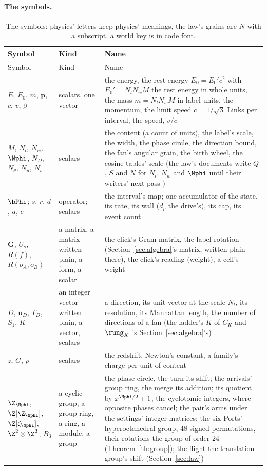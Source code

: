 \paragraph{The symbols.} {\footnotesize
\begin{longtable}{L{1.75in}L{1.0in}L{3.25in}}
\caption{\label{tab:notation}The symbols: physics' letters keep physics' meanings, the law's grains are $N$ with a subscript, a world key is in code font.}\\
\toprule
Symbol & Kind & Name \\
\midrule
\endfirsthead
\toprule
Symbol & Kind & Name \\
\midrule
\endhead
\bottomrule
\endlastfoot
$E$, $E_0$, $m$, $\mathbf p$, $c$, $v$, $\beta$ & scalars, one vector & the energy, the rest energy $E_0 = E_0' c^2$ with $E_0' = N_l N_w M$ the rest energy in whole units, the mass $m = N_l N_w M$ in label units, the momentum, the limit speed $c = 1/\sqrt3$ Links per interval, the speed, $v/c$ \\


$M$, $N_l$, $N_w$, $\Nphi$, $N_D$, $N_\theta$, $N_u$, $N_t$ & scalars & the content (a count of units), the label's scale, the width, the phase circle, the direction bound, the fan's angular grain, the birth wheel, the cosine tables' scale (the law's documents write $Q$, $S$ and $N$ for $N_l$, $N_w$ and $\Nphi$ until their writers' next pass \cite{notation}) \\
$\bPhi$; $s$, $r$, $d$, $a$, $e$ & operator; scalars & the interval's map; one accumulator of the state, its rate, its wall ($d_p$ the drive's), its cap, its event count \\

$\mathbf G$, $U_s$, $R(f)$, $R(o_A, o_B)$ & a matrix, a matrix written plain, a form, a scalar & the click's Gram matrix, the label rotation (Section~\ref{sec:algebra}'s matrix, written plain there), the click's reading (weight), a cell's weight \\
$D$, $\mathbf u_D$, $T_D$, $S_1$, $K$ & an integer vector written plain, a vector, scalars & a direction, its unit vector at the scale $N_l$, its resolution, its Manhattan length, the number of directions of a fan (the ladder's $K$ of $C_K$ and $\rung_K$ is Section~\ref{sec:algebra}'s) \\



$z$, $G$, $\rho$ & scalars & the redshift, Newton's constant, a family's charge per unit of content \\
$\Z_{\Nphi}$, $\Z[\Z_{\Nphi}]$, $\Z[\zeta_{\Nphi}]$, $\Z^2 \otimes \Z^2$, $B_3$ & a cyclic group, a group ring, a ring, a module, a group & the phase circle, the turn its shift; the arrivals' group ring, the merge its addition; its quotient by $x^{\Nphi/2} + 1$, the cyclotomic integers, where opposite phases cancel; the pair's arms under the settings' integer matrices; the six Ports' hyperoctahedral group, $48$ signed permutations, their rotations the group of order $24$ (Theorem~\ref{th:group}); the flight the translation group's shift (Section~\ref{sec:law}) \\



\end{longtable}}

